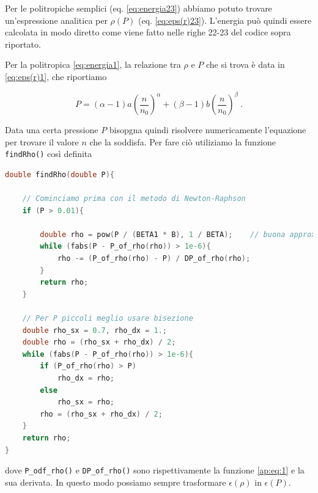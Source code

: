 \documentclass[a4paper, titlepage]{article}
\begin{document}
Per le politropiche semplici (eq. \ref{eq:energia23}) abbiamo potuto trovare un'espressione analitica per $\rho (P)$ (eq. \ref{eq:eps(r)23}). L'energia può quindi essere calcolata in modo diretto come viene fatto nelle righe 22-23 del codice sopra riportato.

Per la politropica \ref{eq:energia1}, la relazione tra $\rho$ e $P$ che si trova è data in \ref{eq:eps(r)1}, che riportiamo

\begin{equation}
        P = (\alpha - 1) a \left( \frac{n}{n_0} \right)^{\alpha} + (\beta - 1) b \left( \frac{n}{n_0} \right)^{\beta} \ .
        \label{ap:eq:1}
\end{equation}

Data una certa pressione $P$ bisopgna quindi risolvere numericamente l'equazione per trovare il valore $n$ che la soddisfa. Per fare ciò utiliziamo la funzione \texttt{findRho()} così definita

\begin{lstlisting}[language=C]
double findRho(double P){

    // Cominciamo prima con il metodo di Newton-Raphson
    if (P > 0.01){

        double rho = pow(P / (BETA1 * B), 1 / BETA);    // buona approx. iniziale
        while (fabs(P - P_of_rho(rho)) > 1e-6){
            rho -= (P_of_rho(rho) - P) / DP_of_rho(rho);
        }
        return rho;
    }

    // Per P piccoli meglio usare bisezione
    double rho_sx = 0.7, rho_dx = 1.;
    double rho = (rho_sx + rho_dx) / 2;
    while (fabs(P - P_of_rho(rho)) > 1e-6){
        if (P_of_rho(rho) > P)
            rho_dx = rho;
        else
            rho_sx = rho;
        rho = (rho_sx + rho_dx) / 2;
    }
    return rho;
}
\end{lstlisting}

dove \texttt{P\_odf\_rho()} e \texttt{DP\_of\_rho()} sono rispettivamente la funzione \ref{ap:eq:1} e la sua derivata. In questo modo possiamo sempre trasformare $\epsilon (\rho)$ in $\epsilon (P)$.
\end{document}
